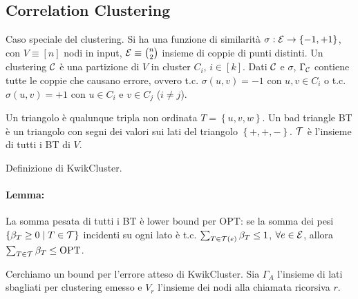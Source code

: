 
\subsection{Correlation Clustering}

Caso speciale del clustering. Si ha una funzione di similarità $\sigma: \mathcal{E} \rightarrow \{-1, +1\}$, con $V \equiv [n]$ nodi in input, $\mathcal{E} \equiv \binom{n}{2}$ insieme di coppie di punti distinti. Un clustering $\mathcal{C}$ è una partizione di $V$ in cluster $C_i$, $i \in [k]$. Dati $\mathcal{C}$ e $\sigma$, $\Gamma_{\mathcal{C}}$ contiene tutte le coppie che causano errore, ovvero t.c. $\sigma (u,v) = -1$ con $u,v \in C_i$ o t.c. $\sigma(u,v) = +1$ con $u \in C_i$ e $v \in C_j$ ($i \neq j$).

Un triangolo è qualunque tripla non ordinata $T = \left\{u,v,w\right\}$. Un bad triangle BT è un triangolo con segni dei valori sui lati del triangolo $\left\{+,+,-\right\}$. $\mathcal{T}$ è l'insieme di tutti i BT di $V$.

Definizione di KwikCluster.

\paragraph{Lemma:} La somma pesata di tutti i BT è lower bound per OPT: se la somma dei pesi $\left\{\beta_T \geq 0 \mid T \in \mathcal{T} \right\}$ incidenti su ogni lato è t.c. $\sum_{T \in \mathcal{T}(e)} \beta_T \leq 1$, $\forall e \in \mathcal{E}$, allora $\sum_{T \in \mathcal{T}} \beta_T \leq \textnormal{OPT}$.

Cerchiamo un bound per l'errore atteso di KwikCluster. Sia $\Gamma_A$ l'insieme di lati sbagliati per clustering emesso e $V_r$ l'insieme dei nodi alla chiamata ricorsiva $r$.

